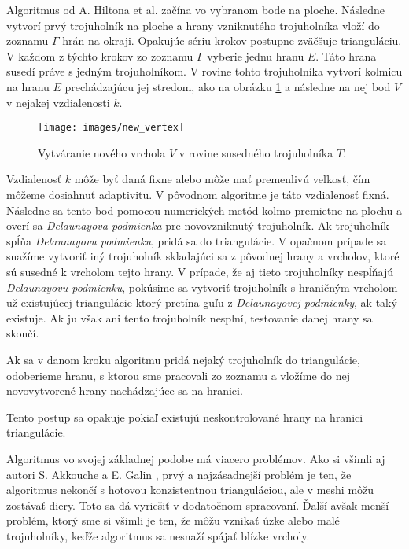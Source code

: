 Algoritmus od A. Hiltona et al. začína vo vybranom bode na ploche. 
Následne vytvorí prvý trojuholník na ploche a hrany vzniknutého 
trojuholníka vloží do zoznamu $\Gamma$ hrán na okraji. 
Opakujúc sériu krokov postupne zväčšuje trianguláciu. V každom z týchto krokov zo zoznamu $\Gamma$
vyberie jednu hranu $E$. Táto hrana susedí práve s jedným trojuholníkom. V rovine tohto 
trojuholníka vytvorí kolmicu na hranu $E$ prechádzajúcu jej stredom, 
ako na obrázku \ref{obr:new_vertex} a následne na nej bod 
$V$ v nejakej vzdialenosti $k$. 

\begin{figure}
    \centerline{\texttt{[image: images/new\_vertex]}}
    \caption[Vytváranie nového vrchola]
    {Vytváranie nového vrchola $V$ v rovine susedného trojuholníka $T$.}
    \label{obr:new_vertex}
\end{figure}

Vzdialenosť $k$ môže byť daná fixne alebo môže mať premenlivú veľkosť, čím môžeme dosiahnuť adaptivitu.
V pôvodnom algoritme je táto vzdialenosť fixná. 
Následne sa tento bod pomocou numerických metód kolmo premietne na plochu a overí sa 
\textit{Delaunayova podmienka} pre novovzniknutý trojuholník. 
Ak trojuholník spĺňa \textit{Delaunayovu podmienku}, pridá sa do triangulácie. V opačnom prípade sa snažíme 
vytvoriť iný trojuholník skladajúci sa z pôvodnej hrany a vrcholov, ktoré sú susedné k vrcholom tejto hrany. 
V prípade, že aj tieto trojuholníky nespĺňajú \textit{Delaunayovu podmienku}, pokúsime sa vytvoriť 
trojuholník s hraničným vrcholom už existujúcej triangulácie ktorý pretína guľu z 
\textit{Delaunayovej podmienky}, ak taký existuje. Ak ju však ani tento trojuholník nesplní, 
testovanie danej hrany sa skončí.

Ak sa v danom kroku algoritmu pridá nejaký trojuholník do triangulácie, odoberieme hranu, 
s ktorou sme pracovali zo zoznamu a vložíme do nej novovytvorené hrany nachádzajúce sa na hranici.

Tento postup sa opakuje pokiaľ existujú neskontrolované hrany na hranici triangulácie.

Algoritmus vo svojej základnej podobe má viacero problémov. Ako si všimli aj autori S. Akkouche 
a E. Galin \cite{akkouche2001adaptive}, prvý a najzásadnejší problém je ten,
že algoritmus nekončí s hotovou konzistentnou trianguláciou, ale v meshi môžu zostávať diery. Toto sa
dá vyriešiť v dodatočnom spracovaní. Ďalší avšak menší problém, ktorý sme si všimli
je ten, že môžu vznikať úzke alebo malé trojuholníky, keďže algoritmus sa nesnaží spájať blízke vrcholy.

